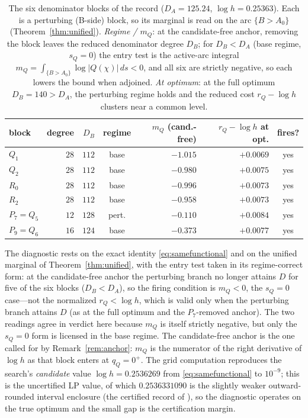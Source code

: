 \documentclass[11pt,reqno]{amsart}
\theoremstyle{plain}
\theoremstyle{definition}
\newcommand{\rQ}{r_Q}
\newcommand{\dA}{D_A}
\newcommand{\dB}{D_B}
\begin{document}
\begin{table}[h]
\centering\small
\renewcommand{\arraystretch}{1.2}
\begin{tabular}{@{}lrrcrrc@{}}
\toprule
block & degree & $\dB$ & regime & $m_Q$ (cand.-free) & $\rQ-\log h$ at opt. & fires?\\
\midrule
$Q_1$ & $28$ & $112$ & base & $-1.015$ & $+0.0069$ & yes\\
$Q_2$ & $28$ & $112$ & base & $-0.980$ & $+0.0075$ & yes\\
$R_0$ & $28$ & $112$ & base & $-0.996$ & $+0.0073$ & yes\\
$R_2$ & $28$ & $112$ & base & $-0.958$ & $+0.0073$ & yes\\
$P_7=Q_5$ & $12$ & $128$ & pert. & $-0.110$ & $+0.0084$ & yes\\
$P_9=Q_6$ & $16$ & $124$ & base & $-0.373$ & $+0.0077$ & yes\\
\bottomrule
\end{tabular}
\medskip
\caption{The six denominator blocks of the \citet{Gri26} record ($\dA=125.24$,
$\log h=0.25363$). Each is a perturbing (B-side) block, so its marginal is read on the
arc $\{B>A_0\}$ (Theorem~\ref{thm:unified}). \emph{Regime / $m_Q$}: at the candidate-free
anchor, removing the block leaves the reduced denominator degree $\dB$; for $\dB<\dA$
(base regime, $s_Q=0$) the entry test is the active-arc integral
$m_Q=\int_{\{B>A_0\}}\log|Q(\chi)|\,ds<0$, and all six are strictly negative, so each
lowers the bound when adjoined. \emph{At optimum}: at the full optimum $\dB=140>\dA$, the
perturbing regime holds and the reduced cost $\rQ-\log h$ clusters near a common level.}
\label{tab:recordfire}
\end{table}

The diagnostic rests on the exact identity \eqref{eq:samefunctional} and on the unified
marginal of Theorem~\ref{thm:unified}, with the entry test taken in its regime-correct
form: at the candidate-free anchor the perturbing branch no longer attains $D$ for five
of the six blocks ($\dB<\dA$), so the firing condition is $m_Q<0$, the $s_Q=0$ case---not
the normalized $\rQ<\log h$, which is valid only when the perturbing branch attains $D$
(as at the full optimum and the $P_7$-removed anchor). The two readings agree in verdict
here because $m_Q$ is itself strictly negative, but only the $s_Q=0$ form is licensed in
the base regime. The candidate-free anchor is the one called for by
Remark~\ref{rem:anchor}: $m_Q$ is the numerator of the right derivative of $\log h$ as
that block enters at $q_Q=0^+$. The grid computation reproduces the search's
\emph{candidate} value $\log h=0.2536269$ from \eqref{eq:samefunctional} to $10^{-9}$;
this is the uncertified LP value, of which $0.2536331090$ is the slightly weaker
outward-rounded interval enclosure (the certified record of \citet{Gri26}), so the
diagnostic operates on the true optimum and the small gap is the certification margin.
\end{document}
